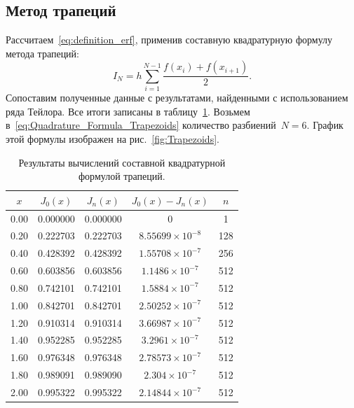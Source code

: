 \documentclass[a4paper, 14pt]{extarticle}
\begin{document}
    \subsection{Метод трапеций}\label{subsec:trapezoid}
    Рассчитаем~\eqref{eq:definition_erf}, применив составную квадратурную формулу метода трапеций:
    \begin{equation}
        \label{eq:Quadrature_Formula_Trapezoids}
        I_{N} = h \sum\limits_{i=1}^{N-1} \frac{f(x_i) + f(x_{i+1})}{2}.
    \end{equation}
    Сопоставим полученные данные с результатами, найденными с использованием ряда Тейлора.
    Все итоги записаны в таблицу~\ref{tab:Trapezoids}.
    Возьмем в~\eqref{eq:Quadrature_Formula_Trapezoids} количество разбиений~$N=6$.
    График этой формулы изображен на рис.~\ref{fig:Trapezoids}.
    \begin{table}[H]
        \centering
        \begin{tabular}{|c|c|c|c|c|}
            \hline
            $x$  & $J_0(x)$ & $J_n(x)$ & $J_0(x)-J_n(x)$        & $n$ \\ \hline
            0.00 & 0.000000 & 0.000000 & 0                      & 1   \\ \hline
            0.20 & 0.222703 & 0.222703 & $8.55699\times10^{-8}$ & 128 \\ \hline
            0.40 & 0.428392 & 0.428392 & $1.55708\times10^{-7}$ & 256 \\ \hline
            0.60 & 0.603856 & 0.603856 & $1.1486\times10^{-7}$  & 512 \\ \hline
            0.80 & 0.742101 & 0.742101 & $1.5884\times10^{-7}$  & 512 \\ \hline
            1.00 & 0.842701 & 0.842701 & $2.50252\times10^{-7}$ & 512 \\ \hline
            1.20 & 0.910314 & 0.910314 & $3.66987\times10^{-7}$ & 512 \\ \hline
            1.40 & 0.952285 & 0.952285 & $3.2961\times10^{-7}$  & 512 \\ \hline
            1.60 & 0.976348 & 0.976348 & $2.78573\times10^{-7}$ & 512 \\ \hline
            1.80 & 0.989091 & 0.989090 & $2.304\times10^{-7}$   & 512 \\ \hline
            2.00 & 0.995322 & 0.995322 & $2.14844\times10^{-7}$ & 512 \\ \hline
        \end{tabular}
        \caption{Результаты вычислений составной квадратурной формулой трапеций.}
        \label{tab:Trapezoids}
    \end{table}
\end{document}
